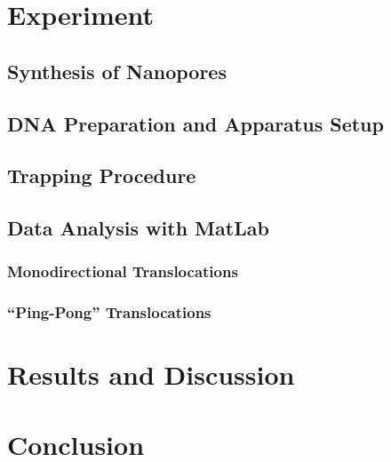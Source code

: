 \documentclass[aps,prl,preprint,groupedaddress]{revtex4}
\begin{document}
\section{Experiment}

\subsection{Synthesis of Nanopores}



\subsection{DNA Preparation and Apparatus Setup}



\subsection{Trapping Procedure}



\subsection{Data Analysis with MatLab}



\subsubsection{Monodirectional Translocations}



\subsubsection{``Ping-Pong'' Translocations}

\section{Results and Discussion}



\section{Conclusion}


\end{document}
